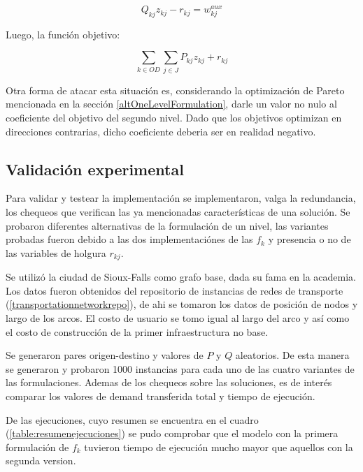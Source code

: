 \documentclass{article}
\begin{document}
  \begin{equation}
    Q_{kj} z_{kj} - r_{kj} = w^{aux}_{kj}
  \end{equation}

  Luego, la función objetivo:

  \begin{equation}
    \sum_{k \in OD} \sum_{j \in J} P_{kj}z_{kj} + r_{kj}
  \end{equation}

  Otra forma de atacar esta situación es, considerando la optimización de Pareto mencionada en la sección \ref{altOneLevelFormulation}, darle un valor no nulo al coeficiente del objetivo del segundo nivel. Dado que los objetivos optimizan en direcciones contrarias, dicho coeficiente deberia ser en realidad negativo.

  \subsection*{Validación experimental}

  Para validar y testear la implementación se implementaron, valga la redundancia, los chequeos que verifican las ya mencionadas características de una solución. Se probaron diferentes alternativas de la formulación de un nivel, las variantes probadas fueron debido a las dos implementaciónes de las $f_k$ y presencia o no de las variables de holgura $r_{kj}$.

  Se utilizó la ciudad de Sioux-Falls como grafo base, dada su fama en la academia. Los datos fueron obtenidos del repositorio de instancias de redes de transporte (\ref{transportationnetworkrepo}), de ahi se tomaron los datos de posición de nodos y largo de los arcos. El costo de usuario se tomo igual al largo del arco y así como el costo de construcción de la primer infraestructura no base.

  Se generaron pares origen-destino y valores de $P$ y $Q$ aleatorios. De esta manera se generaron y probaron 1000 instancias para cada uno de las cuatro variantes de las formulaciones. Ademas de los chequeos sobre las soluciones, es de interés comparar los valores de demand transferida total y tiempo de ejecución.

  De las ejecuciones, cuyo resumen se encuentra en el cuadro (\ref{table:resumenejecuciones}) se pudo comprobar que el modelo con la primera formulación de $f_k$ tuvieron tiempo de ejecución mucho mayor que aquellos con la segunda version.
\end{document}
